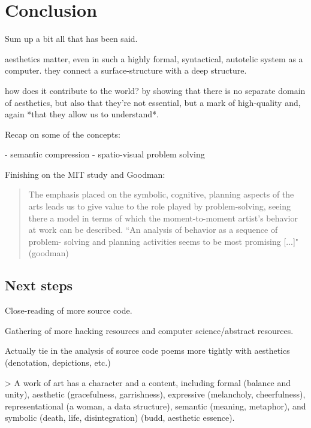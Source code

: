 \documentclass{article}
\begin{document}
\section{Conclusion}

Sum up a bit all that has been said.

aesthetics matter, even in such a highly formal, syntactical, autotelic system as a computer. they connect a surface-structure with a deep structure.

how does it contribute to the world? by showing that there is no separate domain of aesthetics, but also that they're not essential, but a mark of high-quality and, again *that they allow us to understand*.

Recap on some of the concepts:

- semantic compression
- spatio-visual problem solving

Finishing on the MIT study and Goodman:

\begin{quote}
    The emphasis placed on the symbolic, cognitive, planning aspects of the arts leads us to give value to the role played by problem-solving, seeing there a model in terms of which the moment-to-moment artist’s behavior at work can be described. “An analysis of behavior as a sequence of problem- solving and planning activities seems to be most promising [...]" (goodman)
\end{quote}

\subsection{Next steps}

Close-reading of more source code.

Gathering of more hacking resources and computer science/abstract resources.

Actually tie in the analysis of source code poems more tightly with aesthetics (denotation, depictions, etc.)

> A work of art has a character and a content, including formal (balance and unity), aesthetic (gracefulness, garrishness), expressive (melancholy, cheerfulness), representational (a woman, a data structure), semantic (meaning, metaphor), and symbolic (death, life, disintegration) (budd, aesthetic essence).



\end{document}
